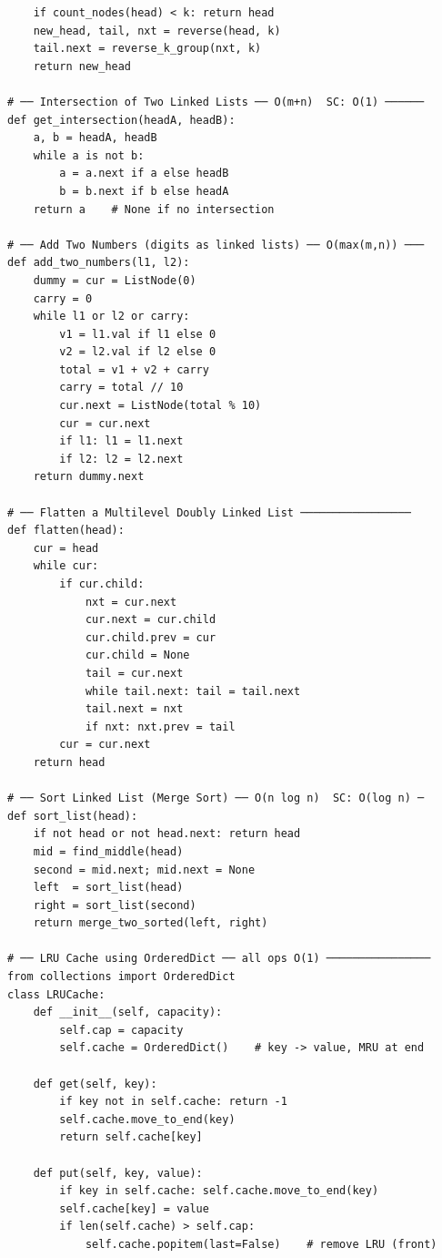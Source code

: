 \documentclass[11pt,a4paper]{report}
\begin{document}
\begin{lstlisting}
    if count_nodes(head) < k: return head
    new_head, tail, nxt = reverse(head, k)
    tail.next = reverse_k_group(nxt, k)
    return new_head

# ── Intersection of Two Linked Lists ── O(m+n)  SC: O(1) ──────
def get_intersection(headA, headB):
    a, b = headA, headB
    while a is not b:
        a = a.next if a else headB
        b = b.next if b else headA
    return a    # None if no intersection

# ── Add Two Numbers (digits as linked lists) ── O(max(m,n)) ───
def add_two_numbers(l1, l2):
    dummy = cur = ListNode(0)
    carry = 0
    while l1 or l2 or carry:
        v1 = l1.val if l1 else 0
        v2 = l2.val if l2 else 0
        total = v1 + v2 + carry
        carry = total // 10
        cur.next = ListNode(total % 10)
        cur = cur.next
        if l1: l1 = l1.next
        if l2: l2 = l2.next
    return dummy.next

# ── Flatten a Multilevel Doubly Linked List ─────────────────
def flatten(head):
    cur = head
    while cur:
        if cur.child:
            nxt = cur.next
            cur.next = cur.child
            cur.child.prev = cur
            cur.child = None
            tail = cur.next
            while tail.next: tail = tail.next
            tail.next = nxt
            if nxt: nxt.prev = tail
        cur = cur.next
    return head

# ── Sort Linked List (Merge Sort) ── O(n log n)  SC: O(log n) ─
def sort_list(head):
    if not head or not head.next: return head
    mid = find_middle(head)
    second = mid.next; mid.next = None
    left  = sort_list(head)
    right = sort_list(second)
    return merge_two_sorted(left, right)

# ── LRU Cache using OrderedDict ── all ops O(1) ────────────────
from collections import OrderedDict
class LRUCache:
    def __init__(self, capacity):
        self.cap = capacity
        self.cache = OrderedDict()    # key -> value, MRU at end

    def get(self, key):
        if key not in self.cache: return -1
        self.cache.move_to_end(key)
        return self.cache[key]

    def put(self, key, value):
        if key in self.cache: self.cache.move_to_end(key)
        self.cache[key] = value
        if len(self.cache) > self.cap:
            self.cache.popitem(last=False)    # remove LRU (front)
\end{lstlisting}

\end{document}
